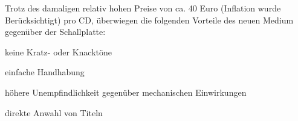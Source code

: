 Trotz des damaligen relativ hohen Preise von ca. 40 Euro (Inflation wurde Berücksichtigt) pro CD, überwiegen die folgenden Vorteile des neuen Medium gegenüber der Schallplatte:
\begin{itemize*}
    \item keine Kratz- oder Knacktöne
    \item einfache Handhabung
    \item höhere Unempfindlichkeit gegenüber mechanischen Einwirkungen
    \item direkte Anwahl von Titeln
\end{itemize*}
